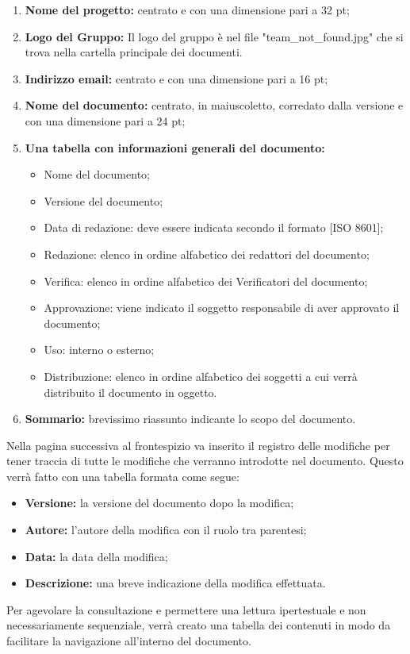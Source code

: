 \documentclass[a4paper,11pt]{article}
\begin{document}
				\begin{enumerate}
					\item \textbf{ Nome del progetto:} centrato e con una dimensione pari a 32 pt; 
					\item \textbf{ Logo del Gruppo:}  Il logo del gruppo è nel file "team\_not\_found.jpg" che si trova nella cartella principale dei documenti.
					\item \textbf{ Indirizzo email:} centrato e con una dimensione pari a 16 pt;
					\item \textbf{ Nome del documento:} centrato, in maiuscoletto, corredato dalla versione e con una dimensione pari a 24 pt; 
					\item \textbf{ Una tabella con informazioni generali del documento: }
					\begin{itemize}
						\item Nome del documento;
						\item Versione del documento;
						\item Data di redazione: deve essere indicata secondo il formato [ISO 8601];
						\item Redazione: elenco in ordine alfabetico dei redattori del documento;
						\item Verifica: elenco in ordine alfabetico dei Verificatori del documento;
						\item Approvazione: viene indicato il soggetto responsabile di aver approvato il documento;
						\item Uso: interno o esterno;
						\item Distribuzione: elenco in ordine alfabetico dei soggetti a cui verrà distribuito il documento in oggetto. 
					\end{itemize}
					\item \textbf{ Sommario:} brevissimo riassunto indicante lo scopo del documento.
				\end{enumerate}
				Nella pagina successiva al frontespizio va inserito il registro delle modifiche per tener traccia di tutte le modifiche che verranno introdotte nel documento. Questo verrà fatto con una tabella formata come segue:
				\begin{itemize}
					\item \textbf{Versione:} la versione del documento dopo la modifica;
					\item \textbf{Autore:} l'autore della modifica con il ruolo tra parentesi;
					\item \textbf{Data:} la data della modifica;
					\item \textbf{Descrizione:} una breve indicazione della modifica effettuata.
				\end{itemize}
				Per agevolare la consultazione e permettere una lettura ipertestuale e non necessariamente sequenziale, verrà creato una tabella dei contenuti in modo da facilitare la navigazione all'interno del documento.
				
\end{document}
